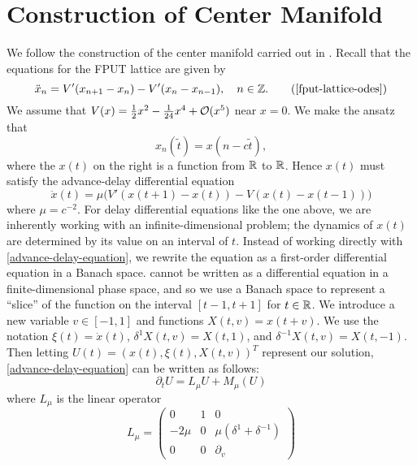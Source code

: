 \section{Construction of Center Manifold}
We follow the construction of the center manifold carried out in \cite{iooss2000travelling}. Recall that the equations for the FPUT lattice are given by
\begin{equation*}
	\ddot x_n = V'(x_{n+1} - x_n) - V'(x_n - x_{n-1}), \quad n \in \Z. \tag{\ref{fput-lattice-odes}}
\end{equation*}
We assume that \(V(x) = \frac 12 x^2 - \frac 1 {24} x^4 + \mathcal{O}(x^5)\) near \(x=0\). We make the ansatz that 
\begin{equation}
	x_n(\tilde t) = x(n-c\tilde t),
\end{equation}
where the \(x(t)\) on the right is a function from \(\mathbb{R}\) to \(\mathbb{R}\). Hence \(x(t)\) must satisfy the advance-delay differential equation
\begin{equation}\label{advance-delay-equation}
	\ddot x (t) = \mu \Big(V'(x(t+1) - x(t)) - V(x(t) - x(t-1)) \Big)
\end{equation}
where \(\mu = c^{-2}\). For delay differential equations like the one above, we are inherently working with an infinite-dimensional problem; the dynamics of \(x(t)\) are determined by its value on an interval of \(t\). Instead of working directly with \cref{advance-delay-equation}, we rewrite the equation as a first-order differential equation in a Banach space.  cannot be written as a differential equation in a finite-dimensional phase space, and so we use a Banach space to represent a ``slice'' of the function on the interval \([t-1,t+1]\) for \(t\in\mathbb{R}\). We introduce a new variable \(v\in[-1,1]\) and functions \(X(t,v) = x(t+v)\). We use the notation \(\xi(t) = \dot x(t)\), \(\delta^1X(t,v) = X(t,1)\), and \(\delta^{-1} X(t,v) = X(t,-1)\). Then letting \(U(t) = (x(t), \xi(t), X(t,v))^T\) represent our solution, \cref{advance-delay-equation} can be written as follows:
\begin{equation}\label{first-order-abstract-ode}
	\partial_t U = L_\mu U + M_\mu (U)
\end{equation}
where \(L_\mu\) is the linear operator
\begin{equation}
	L_\mu = \begin{pmatrix}
		0 & 1 & 0\\
		-2\mu & 0 & \mu(\delta^1 + \delta^{-1}) \\
		0 & 0 & \partial_v
	\end{pmatrix}
\end{equation}
